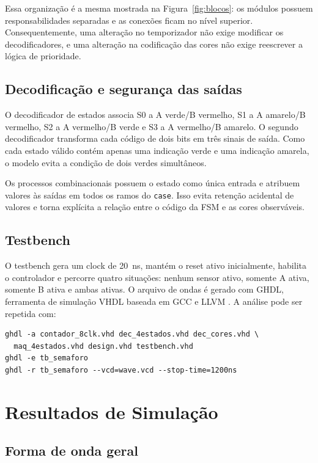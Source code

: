 \documentclass[conference]{IEEEtran}
\begin{document}
Essa organização é a mesma mostrada na Figura~\ref{fig:blocos}: os módulos
possuem responsabilidades separadas e as conexões ficam no nível superior.
Consequentemente, uma alteração no temporizador não exige modificar os
decodificadores, e uma alteração na codificação das cores não exige
reescrever a lógica de prioridade.

\subsection{Decodificação e segurança das saídas}

O decodificador de estados associa S0 a A verde/B vermelho, S1 a A
amarelo/B vermelho, S2 a A vermelho/B verde e S3 a A vermelho/B amarelo.
O segundo decodificador transforma cada código de dois bits em três sinais
de saída. Como cada estado válido contém apenas uma indicação verde e uma
indicação amarela, o modelo evita a condição de dois verdes simultâneos.

Os processos combinacionais possuem o estado como única entrada e atribuem
valores às saídas em todos os ramos do \texttt{case}. Isso evita retenção
acidental de valores e torna explícita a relação entre o código da FSM e as
cores observáveis.

\subsection{Testbench}

O testbench gera um clock de 20~ns, mantém o reset ativo inicialmente,
habilita o controlador e percorre quatro situações: nenhum sensor ativo,
somente A ativa, somente B ativa e ambas ativas. O arquivo de ondas é gerado
com GHDL, ferramenta de simulação VHDL baseada em GCC e LLVM
\cite{ghdlmanual}. A análise pode ser repetida com:

\begin{lstlisting}[caption={Comandos de compilacao e simulacao},
label={lst:ghdl}]
ghdl -a contador_8clk.vhd dec_4estados.vhd dec_cores.vhd \
  maq_4estados.vhd design.vhd testbench.vhd
ghdl -e tb_semaforo
ghdl -r tb_semaforo --vcd=wave.vcd --stop-time=1200ns
\end{lstlisting}

\section{Resultados de Simulação}
\label{sec:resultados}

\subsection{Forma de onda geral}
\end{document}
